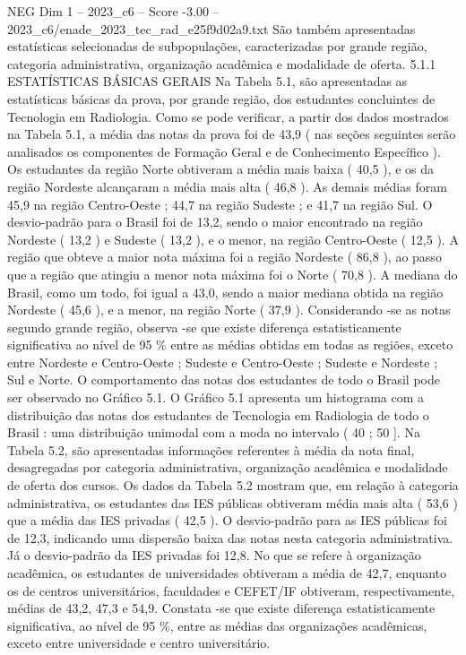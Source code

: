 \begin{textsample}{NEG Dim 1 – 2023\_c6 – Score -3.00 – 2023\_c6/enade\_2023\_tec\_rad\_e25f9d02a9.txt}
São também apresentadas estatísticas selecionadas de subpopulações, caracterizadas por grande região, categoria administrativa, organização acadêmica e modalidade de oferta. 5.1.1 ESTATÍSTICAS BÁSICAS GERAIS Na Tabela 5.1, são apresentadas as estatísticas básicas da prova, por grande região, dos estudantes concluintes de Tecnologia em Radiologia.
Como se pode verificar, a partir dos dados mostrados na Tabela 5.1, a média das notas da prova foi de 43,9 ( nas seções seguintes serão analisados os componentes de Formação Geral e de Conhecimento Específico ).
Os estudantes da região Norte obtiveram a média mais baixa ( 40,5 ), e os da região Nordeste alcançaram a média mais alta ( 46,8 ).
As demais médias foram 45,9 na região Centro-Oeste ; 44,7 na região Sudeste ; e 41,7 na região Sul.
O desvio-padrão para o Brasil foi de 13,2, sendo o maior encontrado na região Nordeste ( 13,2 ) e Sudeste ( 13,2 ), e o menor, na região Centro-Oeste ( 12,5 ).
A região que obteve a maior nota máxima foi a região Nordeste ( 86,8 ), ao passo que a região que atingiu a menor nota máxima foi o Norte ( 70,8 ).
A mediana do Brasil, como um todo, foi igual a 43,0, sendo a maior mediana obtida na região Nordeste ( 45,6 ), e a menor, na região Norte ( 37,9 ).
Considerando -se as notas segundo grande região, observa -se que existe diferença estatisticamente significativa ao nível de 95 \% entre as médias obtidas em todas as regiões, exceto entre Nordeste e Centro-Oeste ; Sudeste e Centro-Oeste ; Sudeste e Nordeste ; Sul e Norte.
O comportamento das notas dos estudantes de todo o Brasil pode ser observado no Gráfico 5.1.
O Gráfico 5.1 apresenta um histograma com a distribuição das notas dos estudantes de Tecnologia em Radiologia de todo o Brasil : uma distribuição unimodal com a moda no intervalo ( 40 ; 50 ].
Na Tabela 5.2, são apresentadas informações referentes à média da nota final, desagregadas por categoria administrativa, organização acadêmica e modalidade de oferta dos cursos.
Os dados da Tabela 5.2 mostram que, em relação à categoria administrativa, os estudantes das IES públicas obtiveram média mais alta ( 53,6 ) que a média das IES privadas ( 42,5 ).
O desvio-padrão para as IES públicas foi de 12,3, indicando uma dispersão baixa das notas nesta categoria administrativa.
Já o desvio-padrão da IES privadas foi 12,8.
No que se refere à organização acadêmica, os estudantes de universidades obtiveram a média de 42,7, enquanto os de centros universitários, faculdades e CEFET/IF obtiveram, respectivamente, médias de 43,2, 47,3 e 54,9.
Constata -se que existe diferença estatisticamente significativa, ao nível de 95 \%, entre as médias das organizações acadêmicas, exceto entre universidade e centro universitário.

\end{textsample}
